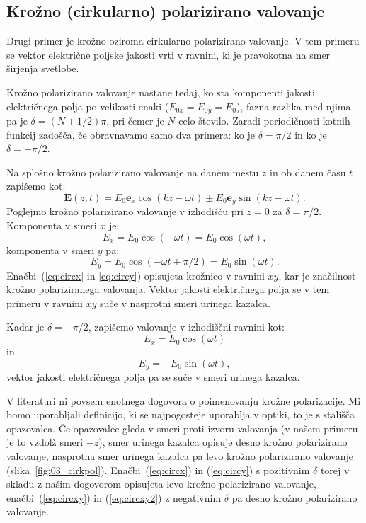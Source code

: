 \subsection*{Krožno (cirkularno) polarizirano valovanje}
Drugi primer je krožno oziroma cirkularno polarizirano valovanje. V tem primeru
se vektor električne poljske jakosti vrti v ravnini, ki je pravokotna na smer 
širjenja svetlobe. 

Krožno polarizirano valovanje nastane tedaj, ko sta komponenti jakosti 
električnega polja po velikosti enaki ($E_{0x} = E_{0y} = E_0$), fazna razlika 
med njima pa je $\delta = (N+1/2) \pi$, pri čemer je $N$ celo število. 
Zaradi periodičnosti kotnih funkcij zadošča, 
če obravnavamo samo dva primera: ko je $\delta = \pi/2$ in ko je 
$\delta = - \pi/2$. 

Na splošno krožno polarizirano valovanje
na danem mestu $z$ in ob danem času $t$ zapišemo kot:
\begin{equation}
\mathbf{E} (z, t) = E_{0} \mathbf{e}_x \cos \left(kz - \omega t\right)
\pm E_{0} \mathbf{e}_y \sin \left(kz - \omega t\right)\!.
\label{eq:03_40}
\end{equation}
Poglejmo krožno polarizirano valovanje v izhodišču pri $z=0$ za 
$\delta = \pi/2$. Komponenta v smeri $x$ je:
\begin{equation}
E_x = E_0 \cos (-\omega t) = E_0 \cos (\omega t),
\label{eq:circx}
\end{equation}
komponenta v smeri $y$ pa:
\begin{equation}
E_y = E_0 \cos (-\omega t + \pi/2) = E_0 \sin (\omega t).
\label{eq:circy}
\end{equation}
Enačbi~(\ref{eq:circx} in \ref{eq:circy}) opisujeta krožnico v ravnini $xy$, 
kar je značilnost krožno polariziranega valovanja. Vektor jakosti
električnega polja se v tem primeru v ravnini $xy$ suče v nasprotni 
smeri urinega kazalca.

Kadar je $\delta = -\pi/2$, zapišemo valovanje v izhodiščni ravnini kot:
\begin{equation}
E_x = E_0 \cos (\omega t)
\label{eq:circxy}
\end{equation}
in 
\begin{equation}
E_y = - E_0 \sin (\omega t),
\label{eq:circxy2}
\end{equation}
vektor jakosti električnega polja pa se suče v smeri urinega kazalca.

V literaturi ni povsem enotnega dogovora o poimenovanju krožne polarizacije. 
Mi bomo uporabljali definicijo, ki se najpogosteje uporablja v optiki, to
je s stališča opazovalca. Če opazovalec gleda v smeri proti izvoru valovanja 
(v našem primeru je to vzdolž smeri $-z$), smer urinega kazalca opisuje desno 
krožno polarizirano valovanje, nasprotna smer urinega kazalca pa levo 
krožno polarizirano valovanje (slika~\ref{fig:03_cirkpol}).
Enačbi~(\ref{eq:circx}) in (\ref{eq:circy}) s pozitivnim
$\delta$ torej v skladu z našim dogovorom opisujeta levo krožno
polarizirano valovanje, enačbi~(\ref{eq:circxy}) in (\ref{eq:circxy2}) 
z negativnim $\delta$ pa desno krožno polarizirano valovanje. 

